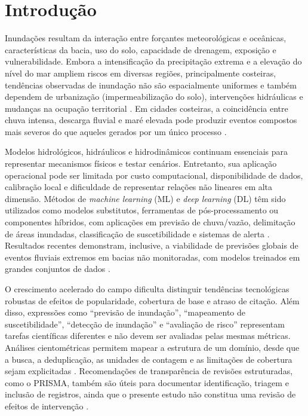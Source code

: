 \section{Introdução}
\label{sec:art-introducao}

Inundações resultam da interação entre forçantes meteorológicas e oceânicas, características da bacia, uso do solo, capacidade de drenagem, exposição e vulnerabilidade. Embora a intensificação da precipitação extrema e a elevação do nível do mar ampliem riscos em diversas regiões, principalmente costeiras, tendências observadas de inundação não são espacialmente uniformes e também dependem de urbanização (impermeabilização do solo), intervenções hidráulicas e mudanças na ocupação territorial \cite{ipcc2022,wahl2015}. Em cidades costeiras, a coincidência entre chuva intensa, descarga fluvial e maré elevada pode produzir eventos compostos mais severos do que aqueles gerados por um único processo \cite{wahl2015}.

Modelos hidrológicos, hidráulicos e hidrodinâmicos continuam essenciais para representar mecanismos físicos e testar cenários. Entretanto, sua aplicação operacional pode ser limitada por custo computacional, disponibilidade de dados, calibração local e dificuldade de representar relações não lineares em alta dimensão. Métodos de \textit{machine learning} (ML) e \textit{deep learning} (DL) têm sido utilizados como modelos substitutos, ferramentas de pós-processamento ou componentes híbridos, com aplicações em previsão de chuva/vazão, delimitação de áreas inundadas, classificação de suscetibilidade e sistemas de alerta \cite{mosavi2018,shen2018,kratzert2018,nearing2021}. Resultados recentes demonstram, inclusive, a viabilidade de previsões globais de eventos fluviais extremos em bacias não monitoradas, com modelos treinados em grandes conjuntos de dados \cite{nearing2024}.

O crescimento acelerado do campo dificulta distinguir tendências tecnológicas robustas de efeitos de popularidade, cobertura de base e atraso de citação. Além disso, expressões como ``previsão de inundação'', ``mapeamento de suscetibilidade'', ``detecção de inundação'' e ``avaliação de risco'' representam tarefas científicas diferentes e não devem ser avaliadas pelas mesmas métricas. Análises cientométricas permitem mapear a estrutura de um domínio, desde que a busca, a deduplicação, as unidades de contagem e as limitações de cobertura sejam explicitadas \cite{aria2017}. Recomendações de transparência de revisões estruturadas, como o PRISMA, também são úteis para documentar identificação, triagem e inclusão de registros, ainda que o presente estudo não constitua uma revisão de efeitos de intervenção \cite{page2021}.

